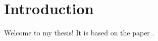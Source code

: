 \section{Introduction}
\label{sec:introduction}

Welcome to my thesis!
It is based on the paper \textcite{kaji2023adversarial}.